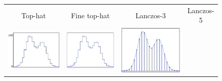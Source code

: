\documentclass[11pt,preprint]{aastex}
\begin{document}
\begin{figure}
\newlength{\figh}
\setlength{\figh}{0.18\textwidth}
\begin{center}
\begin{tabular}{@{}c@{}c@{}c@{}c@{}}
%
Top-hat & Fine top-hat & Lanczos-3 & Lanczos-5 \\
%
\includegraphics[height=\figh]{plots3/boxes-00} &
\includegraphics[height=\figh]{plots3/boxes-01} &
\includegraphics[height=\figh]{plots3/boxes-02} &

\end{tabular}
\end{center}
\end{figure}
\end{document}
